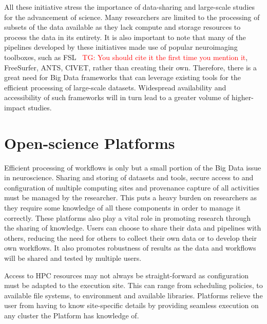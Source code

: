 \documentclass{report}
\newcommand{\tristan}[1]{\textcolor{red}{TG: #1}}
\begin{document}
            All these initiative stress the importance of data-sharing and
            large-scale studies for the advancement of science. Many researchers
            are limited to the processing of subsets of the data available as 
            they lack compute and storage resources to process the data in its
            entirety. It is also important to note that many of the pipelines 
            developed by these initiatives made use of popular neuroimaging 
            toolboxes, such as FSL~\cite{SMITH2004S208} \tristan{You should cite it the first time you mention it}, FreeSurfer, ANTS, 
            CIVET, rather than
            creating their own. Therefore, there is a great need for Big Data
            frameworks that can leverage existing tools for the efficient 
            processing of large-scale datasets. Widespread availability and 
            accessibility of such frameworks will in turn lead to a greater
            volume of higher-impact studies.


        \section{Open-science Platforms}\label{platforms}
            Efficient processing of workflows is only but a small portion of 
            the Big Data issue in neuroscience. %
            Sharing and storing of datasets
            and tools, secure access to and configuration of multiple computing 
            sites and provenance capture of all activities must be managed by 
            the researcher. This puts a heavy burden on researchers as they 
            require some knowledge of all these components in order to manage it
            correctly. These platforms also play a vital role in promoting 
            research through the sharing of knowledge. Users can choose to share
            their data and pipelines with others, reducing the need for others 
            to collect their own data or to develop their own workflows. It 
            also promotes robustness of results as the data and workflows will 
            be shared and tested by multiple users.

            Access to HPC resources may not always be straight-forward as 
            configuration must be adapted to the execution site. This can 
            range from scheduling policies, to available file systems, to 
            environment and available libraries. Platforms relieve the user
            from having to know site-specific details by providing seamless
            execution on any cluster the Platform has knowledge of.
\end{document}

